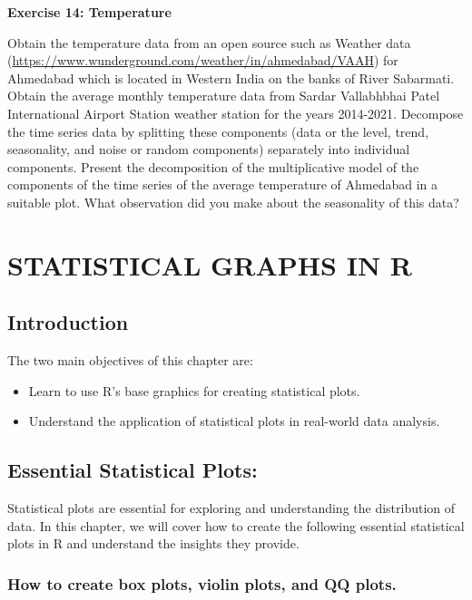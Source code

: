 \documentclass[
]{book}
\providecommand{\tightlist}{%
  \setlength{\itemsep}{0pt}\setlength{\parskip}{0pt}}
\begin{document}
\textbf{Exercise 14: Temperature}

Obtain the temperature data from an open source such as Weather data (\url{https://www.wunderground.com/weather/in/ahmedabad/VAAH}) for Ahmedabad which is located in Western India on the banks of River Sabarmati. Obtain the average monthly temperature data from Sardar Vallabhbhai Patel International Airport Station weather station for the years 2014-2021. Decompose the time series data by splitting these components (data or the level, trend, seasonality, and noise or random components) separately into
individual components. Present the decomposition of the multiplicative model of the components of the time series of the average
temperature of Ahmedabad in a suitable plot. What observation did you make about the seasonality of this data?

\chapter{STATISTICAL GRAPHS IN R}\label{statistical-graphs-in-r}

\section{Introduction}\label{introduction-4}

The two main objectives of this chapter are:

\begin{itemize}
\tightlist
\item
  Learn to use R's base graphics for creating statistical plots.
\item
  Understand the application of statistical plots in real-world data analysis.
\end{itemize}

\section{Essential Statistical Plots:}\label{essential-statistical-plots}

Statistical plots are essential for exploring and understanding the distribution of data. In this chapter, we will cover how to create the following essential statistical plots in R and understand the insights they provide.

\subsection{How to create box plots, violin plots, and QQ plots.}\label{how-to-create-box-plots-violin-plots-and-qq-plots.}
\end{document}
